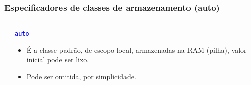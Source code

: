 \documentclass{beamer}
\begin{document}
\begin{frame}
\end{frame}

\begin{frame}
	\frametitle{Especificadores de classes de armazenamento (auto)}
\begin{columns}[T] %
	\begin{column}{.55\textwidth}
		
	\end{column}%
	\hfill%
	\begin{column}{.45\textwidth}
		\begin{center}
			\texttt{\textcolor{blue}{auto}}
		\end{center}
		\vspace*{0.5cm}
		\begin{itemize}
			\item É a classe padrão, de escopo local, armazenadas na RAM (pilha), valor inicial pode ser lixo.
			\item Pode ser omitida, por simplicidade.
		\end{itemize}
	\end{column}%
\end{columns}
\end{frame}
\end{document}
